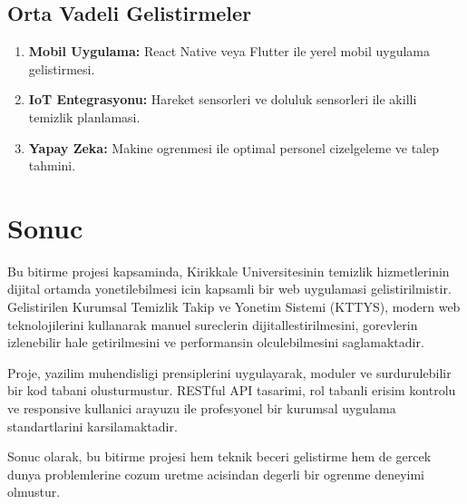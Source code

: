 \subsection{Orta Vadeli Gelistirmeler}
\label{subsec:orta-vadeli}

\begin{enumerate}
    \item \textbf{Mobil Uygulama:} React Native veya Flutter ile 
    yerel mobil uygulama gelistirmesi.
    
    \item \textbf{IoT Entegrasyonu:} Hareket sensorleri ve doluluk 
    sensorleri ile akilli temizlik planlamasi.
    
    \item \textbf{Yapay Zeka:} Makine ogrenmesi ile optimal 
    personel cizelgeleme ve talep tahmini.
\end{enumerate}

\section{Sonuc}
\label{sec:sonuc-bolumu}

Bu bitirme projesi kapsaminda, Kirikkale Universitesinin temizlik 
hizmetlerinin dijital ortamda yonetilebilmesi icin kapsamli bir 
web uygulamasi gelistirilmistir. Gelistirilen Kurumsal Temizlik 
Takip ve Yonetim Sistemi (KTTYS), modern web teknolojilerini 
kullanarak manuel sureclerin dijitallestirilmesini, gorevlerin 
izlenebilir hale getirilmesini ve performansin olculebilmesini 
saglamaktadir.

Proje, yazilim muhendisligi prensiplerini uygulayarak, moduler 
ve surdurulebilir bir kod tabani olusturmustur. RESTful API 
tasarimi, rol tabanli erisim kontrolu ve responsive kullanici 
arayuzu ile profesyonel bir kurumsal uygulama standartlarini 
karsilamaktadir.

Sonuc olarak, bu bitirme projesi hem teknik beceri gelistirme 
hem de gercek dunya problemlerine cozum uretme acisindan 
degerli bir ogrenme deneyimi olmustur.
